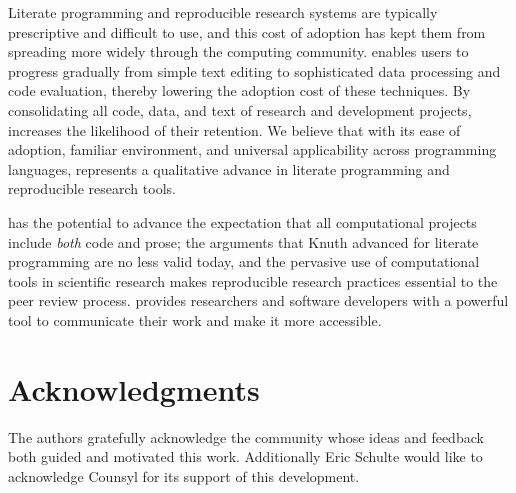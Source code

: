 \documentclass[article,shortnames]{jss}
\begin{document}
Literate programming and reproducible research systems are typically
prescriptive and difficult to use, and this cost of adoption has kept
them from spreading more widely through the computing community.
 enables users to progress gradually from simple text editing
to sophisticated data processing and code evaluation, thereby lowering
the adoption cost of these techniques.  By consolidating all code,
data, and text of research and development projects,  increases
the likelihood of their retention.  We believe that with its ease of
adoption, familiar environment, and universal applicability across
programming languages,  represents a qualitative advance in
literate programming and reproducible research tools.

 has the potential to advance the expectation that all
computational projects include \emph{both} code and prose; the arguments
that Knuth advanced for literate programming are no less valid today,
and the pervasive use of computational tools in scientific research
makes reproducible research practices essential to the peer review
process.   provides researchers and software developers with a
powerful tool to communicate their work and make it more accessible.
\section{Acknowledgments}
\label{sec-6}
\label{acknowledgments}

The authors gratefully acknowledge the  community whose ideas
and feedback both guided and motivated this work.  Additionally Eric
Schulte would like to acknowledge Counsyl for its support of this
development.

  
\end{document}
